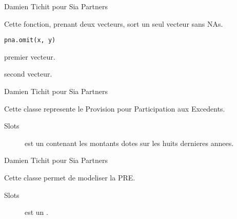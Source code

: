 \documentclass[a4paper]{book}
\begin{document}
%
\begin{Author}\relax
Damien Tichit pour Sia Partners
\end{Author}
%
\begin{Description}\relax
Cette fonction, prenant deux vecteurs, sort un seul vecteur sans NAs.
\end{Description}
%
\begin{Usage}
\begin{verbatim}
pna.omit(x, y)
\end{verbatim}
\end{Usage}
%
\begin{Arguments}
\begin{ldescription}
\item[\code{x}] premier vecteur.

\item[\code{y}] second vecteur.
\end{ldescription}
\end{Arguments}
%
\begin{Author}\relax
Damien Tichit pour Sia Partners
\end{Author}
%
\begin{Description}\relax
Cette classe represente le Provision pour Participation aux Excedents.
\end{Description}
%
\begin{Section}{Slots}

\begin{description}

\item[] est un  contenant les montants dotes sur les huits dernieres annees.

\end{description}
\end{Section}
%
\begin{Author}\relax
Damien Tichit pour Sia Partners
\end{Author}
%
\begin{Description}\relax
Cette classe permet de modeliser la PRE.
\end{Description}
%
\begin{Section}{Slots}

\begin{description}

\item[] est un .

\end{description}
\end{Section}
\end{document}
